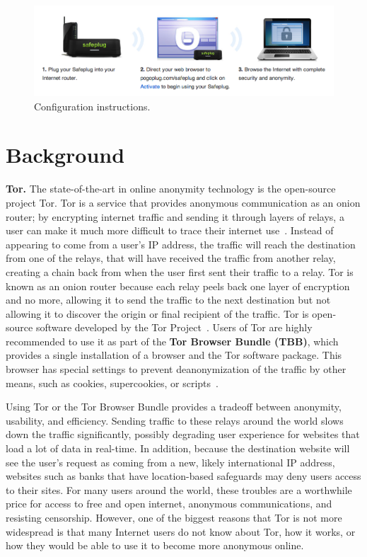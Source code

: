 \documentclass[conference]{IEEEtran}
\begin{document}
\begin{figure}[t]
\begin{center}
\includegraphics[width=.75\textwidth]{instructions}
\caption{Configuration instructions.}
\label{fig:instructions}
\end{center}
\end{figure}  

\section{Background}
{\bf Tor.} The state-of-the-art in online anonymity technology is the open-source project Tor.  Tor is a service that provides anonymous communication as an onion router; by encrypting internet traffic and sending it through layers of relays, a user can make it much more difficult to trace their internet use~\cite{tor}.  Instead of appearing to come from a user's IP address, the traffic will reach the destination from one of the relays, that will have received the traffic from another relay, creating a chain back from when the user first sent their traffic to a relay.  Tor is known as an onion router because each relay peels back one layer of encryption and no more, allowing it to send the traffic to the next destination but not allowing it to discover the origin or final recipient of the traffic.  Tor is open-source software developed by the Tor Project~\cite{torproject}.  Users of Tor are highly recommended to use it as part of the {\bf Tor Browser Bundle (TBB)}, which provides a single installation of a browser and the Tor software package.  This browser has special settings to prevent deanonymization of the traffic by other means, such as cookies, supercookies, or scripts~\cite{torproject}.

Using Tor or the Tor Browser Bundle provides a tradeoff between anonymity, usability, and efficiency.  Sending traffic to these relays around the world slows down the traffic significantly, possibly degrading user experience for websites that load a lot of data in real-time.  In addition, because the destination website will see the user's request as coming from a new, likely international IP address, websites such as banks that have location-based safeguards may deny users access to their sites.  For many users around the world, these troubles are a worthwhile price for access to free and open internet, anonymous communications, and resisting censorship.  However, one of the biggest reasons that Tor is not more widespread is that many Internet users do not know about Tor, how it works, or how they would be able to use it to become more anonymous online.
\end{document}
